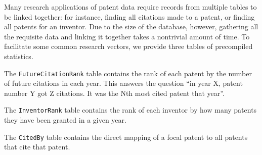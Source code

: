 Many research applications of patent data require records from multiple
tables to be linked together: for instance, finding all citations
made to a patent, or finding all patents for an inventor. Due to the
size of the database, however, gathering all the requisite data and
linking it together takes a nontrivial amount of time. To facilitate
some common research vectors, we provide three tables of precompiled
statistics.

The \verb`FutureCitationRank` table contains the rank of each patent
by the number of future citations in each year. This answers the question
``in year X, patent number Y got Z citations. It was the Nth most
cited patent that year''.

The \verb`InventorRank` table contains the rank of each inventor
by how many patents they have been granted in a given year.

The \verb`CitedBy` table contains the direct mapping of a focal patent
to all patents that cite that patent. 
